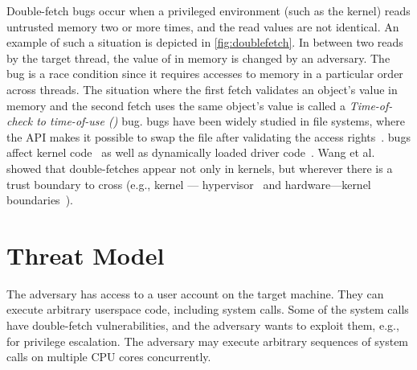 \documentclass[letterpaper,twocolumn,10pt, anonymous]{article}
\begin{document}
Double-fetch bugs occur when a privileged environment (such as the kernel)
reads untrusted memory two or more times, and the read values are not 
identical. 
An example of such a situation is depicted in \autoref{fig:doublefetch}.
In between two reads by the target thread, the value of  in memory 
is changed by an adversary.
The bug is a race condition since it requires accesses to memory in 
a particular order across threads.
The situation where the first fetch validates an object's value in memory and 
the second fetch uses the same object's value is called a 
\emph{Time-of-check to time-of-use (\tocttou)} bug.
\tocttou bugs have been widely studied in file systems, where the 
API makes it possible to swap the file after validating the access 
rights~\cite{payer2012protecting,
pu2006methodical, wei2010modeling, tsafrir2008portably}.
\tocttou bugs affect kernel code~\cite{jurczyk2013bochspwn, wang2018survey}
as well as dynamically loaded driver code~\cite{cve201812633,cve201812633fix}.
Wang et al.~\cite{wang2018survey} showed that double-fetches appear not only
in kernels, but wherever there is a trust boundary to cross (e.g., kernel ---
hypervisor~\cite{wilhelm2016xenpwn} and hardware---kernel
boundaries~\cite{lu2018untrusted}). 




\section{Threat Model}
\label{sec:threatmodel}

The adversary has access to a user account on the target machine. They can
execute arbitrary userspace code, including system calls. Some of the system 
calls have double-fetch vulnerabilities, and the adversary wants to exploit them,
e.g., for privilege escalation.
The adversary may execute arbitrary sequences of system calls on multiple CPU
cores concurrently.
\end{document}
